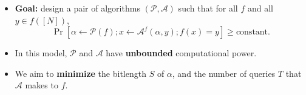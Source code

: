 \documentclass[usenames, dvipsnames, t, table]{beamer}
\newcommand{\A}{\mathcal{A}}
\renewcommand{\P}{\mathcal{P}}
\begin{document}
\begin{frame}[fragile]
\begin{itemize}
\item \textbf{Goal:} design a pair of algorithms $(\P, \A)$ such that for all $f$ and all $y \in f([N])$,
     \[\Pr[\alpha \gets \P(f); x \gets \A^f(\alpha, y); f(x) = y] \geq \text{constant}.\]
     \mypause
   \item In this model, $\P$ and $\A$ have \textbf{unbounded} computational power.
     \pause
   \item We aim to \textbf{minimize} the bitlength $S$ of $\alpha$, and the number of queries $T$ that $\A$ makes to $f$.
   \end{itemize}
 \end{frame}

\end{document}
